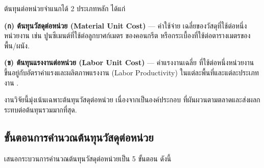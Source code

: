 ต้นทุนต่อหน่วยจำแนกได้ 2 ประเภทหลัก ได้แก่

\textbf{(ก) ต้นทุนวัสดุต่อหน่วย (Material Unit Cost)} --- ค่าใช้จ่าย
เฉลี่ยของวัสดุที่ใช้ต่อหนึ่งหน่วยงาน เช่น ปูนซีเมนต์ที่ใช้ต่อลูกบาศก์เมตร
ของคอนกรีต หรือกระเบื้องที่ใช้ต่อตารางเมตรของพื้น/ผนัง.

\textbf{(ข) ต้นทุนแรงงานต่อหน่วย (Labor Unit Cost)} --- ค่าแรงงานเฉลี่ย
ที่ใช้ต่อหนึ่งหน่วยงาน ขึ้นอยู่กับอัตราค่าแรงและผลิตภาพแรงงาน
(Labor Productivity) ในแต่ละพื้นที่และแต่ละประเภทงาน \cite{leung2005}.

งานวิจัยนี้มุ่งเน้นเฉพาะต้นทุนวัสดุต่อหน่วย เนื่องจากเป็นองค์ประกอบ
ที่ผันผวนตามตลาดและส่งผลกระทบต่อต้นทุนรวมมากที่สุด.

\subsection{ขั้นตอนการคำนวณต้นทุนวัสดุต่อหน่วย}

\textcite{ashworth2015} เสนอกระบวนการคำนวณต้นทุนวัสดุต่อหน่วยเป็น 5 ขั้นตอน
ดังนี้

